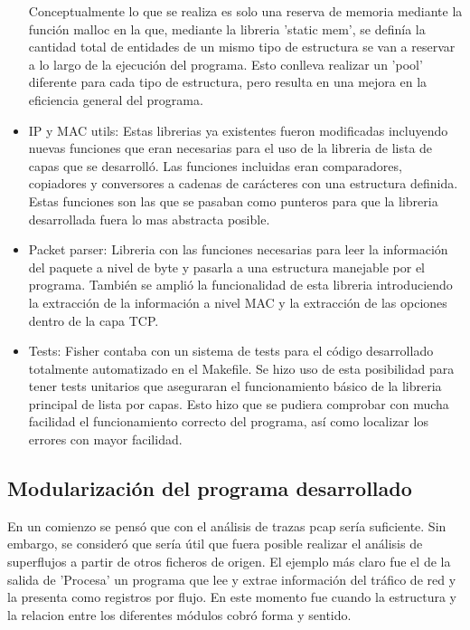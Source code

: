 \documentclass[twoside, 12pt]{epstfg}
\begin{document}
\begin{itemize}[itemsep=0pt, topsep = 5pt]
  Conceptualmente lo que se realiza es solo una reserva de memoria mediante la función malloc en la que, mediante la libreria 'static mem', se definía la cantidad total de entidades de un mismo tipo de estructura se van a reservar a lo largo de la ejecución del programa. Esto conlleva realizar un 'pool' diferente para cada tipo de estructura, pero resulta en una mejora en la eficiencia general del programa.
  \item IP y MAC utils: Estas librerias ya existentes fueron modificadas incluyendo nuevas funciones que eran necesarias para el uso de la libreria de lista de capas que se desarrolló. Las funciones incluidas eran comparadores, copiadores y conversores a cadenas de carácteres con una estructura definida. Estas funciones son las que se pasaban como punteros para que la libreria desarrollada fuera lo mas abstracta posible.
  \item Packet parser: Libreria con las funciones necesarias para leer la información del paquete a nivel de byte y pasarla a una estructura manejable por el programa. También se amplió la funcionalidad de esta libreria introduciendo la extracción de la información a nivel MAC y la extracción de las opciones dentro de la capa TCP.
  \item Tests: Fisher contaba con un sistema de tests para el código desarrollado totalmente automatizado en el Makefile. Se hizo uso de esta posibilidad para tener tests unitarios que aseguraran el funcionamiento básico de la libreria principal de lista por capas. Esto hizo que se pudiera comprobar con mucha facilidad el funcionamiento correcto del programa, así como localizar los errores con mayor facilidad.
\end{itemize}

\subsection{Modularización del programa desarrollado}
En un comienzo se pensó que con el análisis de trazas pcap sería suficiente. Sin embargo, se consideró que sería útil que fuera posible realizar el análisis de superflujos a partir de otros ficheros de origen. El ejemplo más claro fue el de la salida de 'Procesa' un programa que lee y extrae información del tráfico de red y la presenta como registros por flujo. En este momento fue cuando la estructura y la relacion entre los diferentes módulos cobró forma y sentido. 
\end{document}
